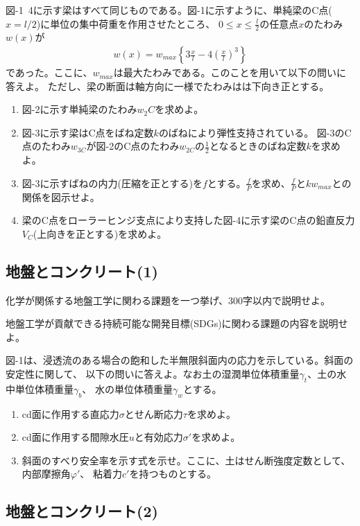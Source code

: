 図-1~4に示す梁はすべて同じものである。図-1に示すように、単純梁のC点($x=l/2$)に単位の集中荷重を作用させたところ、
$0\leq x \leq \frac{l}{2}$の任意点$x$のたわみ$w(x)$が
\begin{align*}%
  w(x) = w_{max}\left\{3\frac{x}{l}-4\left(\frac{x}{l}\right)^3\right\}
\end{align*}
であった。ここに、$w_{max}$は最大たわみである。このことを用いて以下の問いに答えよ。
ただし、梁の断面は軸方向に一様でたわみはは下向き正とする。

\begin{enumerate}[1.]
  \item 図-2に示す単純梁のたわみ$w_2C$を求めよ。
  \item 図-3に示す梁はC点をばね定数$k$のばねにより弾性支持されている。
        図-3のC点のたわみ$w_{3C}$が図-2のC点のたわみ$w_{2C}$の$\frac{1}{2}$となるときのばね定数$k$を求めよ。
  \item 図-3に示すばねの内力(圧縮を正とする)を$f$とする。$\frac{f}{P}$を求め、$\frac{f}{P}$と$kw_{max}$との
        関係を図示せよ。
  \item 梁のC点をローラーヒンジ支点により支持した図-4に示す梁のC点の鉛直反力$V_C$(上向きを正とする)を求めよ。
\end{enumerate}

\subsection{地盤とコンクリート(1)}

化学が関係する地盤工学に関わる課題を一つ挙げ、300字以内で説明せよ。

地盤工学が貢献できる持続可能な開発目標(SDGs)に関わる課題の内容を説明せよ。

図-1は、浸透流のある場合の飽和した半無限斜面内の応力を示している。斜面の安定性に関して、
以下の問いに答えよ。なお土の湿潤単位体積重量$\gamma_t$、土の水中単位体積重量$\gamma_b$、
水の単位体積重量$\gamma_w$とする。
\begin{enumerate}[(1)]
  \item cd面に作用する直応力$\sigma$とせん断応力$\tau$を求めよ。
  \item cd面に作用する間隙水圧$u$と有効応力$\sigma'$を求めよ。
  \item 斜面のすべり安全率を示す式を示せ。ここに、土はせん断強度定数として、内部摩擦角$\varphi'$、
        粘着力$c'$を持つものとする。
\end{enumerate}

\subsection{地盤とコンクリート(2)}


